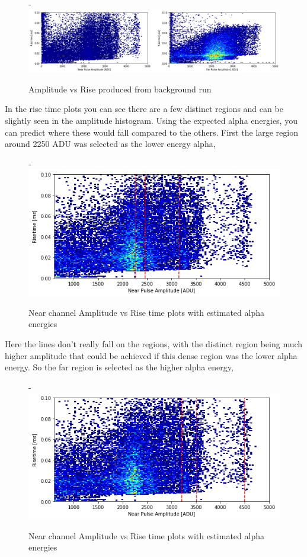 \documentclass[a4paper]{article}
\begin{document}
\begin{figure}[H]-
        \centering
        \includegraphics[width=1\linewidth]{Radon/va28n002_rise_.png}
        \caption{Amplitude vs Rise produced from background run}
        \label{fig:south2d}
        \end{figure}
\noindent In the rise time plots you can see there are a few distinct regions and can be slightly seen in the amplitude histogram. Using the expected alpha energies, you can predict where these would fall compared to the others. First the large region around 2250 ADU was selected as the lower energy alpha, 
\begin{figure}[H]-
        \centering
        \includegraphics[width=1\linewidth]{Radon/va28n002_rise_lineslow.png}
        \caption{Near channel Amplitude vs Rise time plots with estimated alpha energies}
        \label{fig:south2d}
        \end{figure}
\noindent Here the lines don't really fall on the regions, with the distinct region being much higher amplitude that could be achieved if this dense region was the lower alpha energy. So the far region is selected as the higher alpha energy,
\begin{figure}[H]-
        \centering
        \includegraphics[width=1\linewidth]{Radon/va28n002_rise_lineshigh.png}
        \caption{Near channel Amplitude vs Rise time plots with estimated alpha energies}
        \label{fig:south2d}
        \end{figure}
\end{document}
